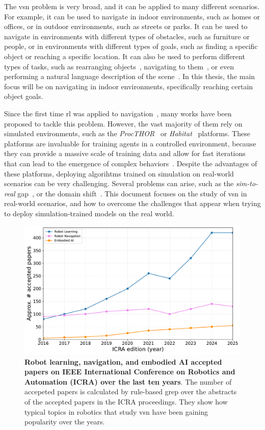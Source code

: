 The \acrshort{vsn} problem is very broad, and it can be applied to many different scenarios.
For example, it can be used to navigate in indoor environments, such as homes or offices, or in outdoor environments, such as streets or parks.
It can be used to navigate in environments with different types of obstacles, such as furniture or people, or in environments with different types of goals, such as finding a specific object or reaching a specific location.
It can also be used to perform different types of tasks, such as rearranging objects~\cite{NEURIPS2021_021bbc7e}, navigating to them~\cite{batra2020}, or even performing a natural language description of the scene~\cite{Tan2021EmbodiedSD}.
In this thesis, the main focus will be on navigating in indoor environments, specifically reaching certain object goals.

Since the first time \acrshort{rl} was applied to navigation~\cite{MAHADEVAN1992311}, many works have been proposed to tackle this problem.
However, the vast majority of them rely on simulated environments, such as the \textit{ProcTHOR}~\cite{Deitke2022ProcTHORLE} or \textit{Habitat}~\cite{NEURIPS2021_021bbc7e} platforms.
These platforms are invaluable for training agents in a controlled environment, because they can provide a massive scale of training data and allow for fast iterations that can lead to the emergence of complex behaviors~\cite{Wijmans2022EmergenceOI}.
Despite the advantages of these platforms, deploying algorihtms trained on simulation on real-world scenarios can be very challenging.
Several problems can arise, such as the \textit{sim-to-real} gap~\cite{kadian2020}, or the domain shift~\cite{kim2022}.
This document focuses on the study of \acrshort{vsn} in real-world scenarios, and how to overcome the challenges that appear when trying to deploy simulation-trained models on the real world.

\begin{figure}
    \centering
    \includegraphics[width=\textwidth]{figures/introduction/icra_papers}
    \caption{\textbf{Robot learning, navigation, and embodied AI accepted papers on IEEE International Conference on Robotics and Automation (ICRA) over the last ten years}. The number of accepeted papers is calculated by rule-based grep over the abstracts of the accepted papers in the ICRA proceedings. They show how typical topics in robotics that study \acrshort{vsn} have been gaining popularity over the years.}
    \label{fig:icra_papers}
\end{figure}

